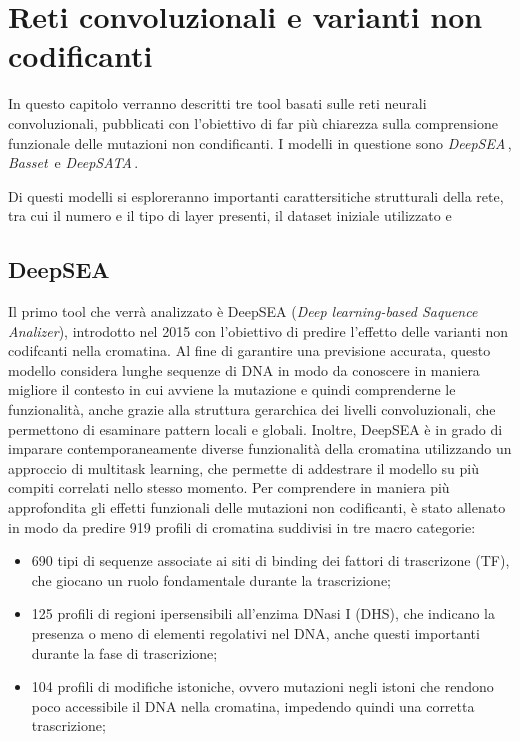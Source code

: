 \chapter{Reti convoluzionali e varianti non codificanti}\label{chp:CNN-non-coding-variants}

In questo capitolo verranno descritti tre tool basati sulle reti neurali convoluzionali, pubblicati con l'obiettivo di far più chiarezza sulla comprensione funzionale delle mutazioni non condificanti. I modelli in questione sono \textsl{DeepSEA}\,\cite{zhou2015predicting}, \textsl{Basset}\,\cite{kelley2016basset} e \textsl{DeepSATA}\,\cite{ma2023deepsata}.

Di questi modelli si esploreranno importanti carattersitiche strutturali della rete, tra cui il numero e il tipo di layer presenti, il dataset iniziale utilizzato e 



\section{DeepSEA}\label{sec:DeepSEA}
% 
Il primo tool che verrà analizzato è DeepSEA (\textit{Deep learning-based Saquence Analizer}), introdotto nel 2015 con l'obiettivo di predire l'effetto delle varianti non codifcanti nella cromatina. Al fine di garantire una previsione accurata, questo modello considera lunghe sequenze di \acs{DNA} in modo da conoscere in maniera migliore il contesto in cui avviene la mutazione e quindi comprenderne le funzionalità, anche grazie alla struttura gerarchica dei livelli convoluzionali, che permettono di esaminare pattern locali e globali. 
Inoltre, DeepSEA è in grado di imparare contemporaneamente diverse funzionalità della cromatina utilizzando un approccio di multitask learning, che permette di addestrare il modello su più compiti correlati nello stesso momento. Per comprendere in maniera più approfondita gli effetti funzionali delle mutazioni non codificanti, è stato allenato in modo da predire 919 profili di cromatina suddivisi in tre macro categorie:
% 
\begin{itemize}
    \item 690 tipi di sequenze associate ai siti di binding dei fattori di trascrizone (\acs{TF}), che giocano un ruolo fondamentale durante la trascrizione;
    \item 125 profili di regioni ipersensibili all'enzima DNasi I (\acs{DHS}), che indicano la presenza o meno di elementi regolativi nel \acs{DNA}, anche questi importanti durante la fase di trascrizione;
    \item 104 profili di modifiche istoniche, ovvero mutazioni negli istoni che rendono poco accessibile il \acs{DNA} nella cromatina, impedendo quindi una corretta trascrizione;
\end{itemize}
% 

